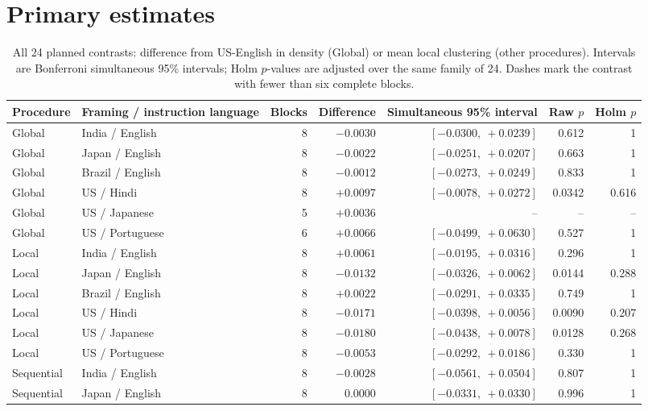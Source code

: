 \documentclass{article}
\begin{document}



\clearpage\onecolumn\appendix
\section{Primary estimates}
\begin{table}[ht]\centering
\caption{All 24 planned contrasts: difference from US-English in density (Global) or mean local clustering (other procedures). Intervals are Bonferroni simultaneous 95\% intervals; Holm $p$-values are adjusted over the same family of 24. Dashes mark the contrast with fewer than six complete blocks.}\label{contrasts}
\small\begin{tabular}{llrrrrr}\toprule Procedure & Framing / instruction language & Blocks & Difference & Simultaneous 95\% interval & Raw $p$ & Holm $p$\\\midrule
Global & India / English & 8 & $-0.0030$ & $[-0.0300,\ +0.0239]$ & 0.612 & 1 \\
Global & Japan / English & 8 & $-0.0022$ & $[-0.0251,\ +0.0207]$ & 0.663 & 1 \\
Global & Brazil / English & 8 & $-0.0012$ & $[-0.0273,\ +0.0249]$ & 0.833 & 1 \\
Global & US / Hindi & 8 & $+0.0097$ & $[-0.0078,\ +0.0272]$ & 0.0342 & 0.616 \\
Global & US / Japanese & 5 & $+0.0036$ & -- & -- & -- \\
Global & US / Portuguese & 6 & $+0.0066$ & $[-0.0499,\ +0.0630]$ & 0.527 & 1 \\
\addlinespace
Local & India / English & 8 & $+0.0061$ & $[-0.0195,\ +0.0316]$ & 0.296 & 1 \\
Local & Japan / English & 8 & $-0.0132$ & $[-0.0326,\ +0.0062]$ & 0.0144 & 0.288 \\
Local & Brazil / English & 8 & $+0.0022$ & $[-0.0291,\ +0.0335]$ & 0.749 & 1 \\
Local & US / Hindi & 8 & $-0.0171$ & $[-0.0398,\ +0.0056]$ & 0.0090 & 0.207 \\
Local & US / Japanese & 8 & $-0.0180$ & $[-0.0438,\ +0.0078]$ & 0.0128 & 0.268 \\
Local & US / Portuguese & 8 & $-0.0053$ & $[-0.0292,\ +0.0186]$ & 0.330 & 1 \\
\addlinespace
Sequential & India / English & 8 & $-0.0028$ & $[-0.0561,\ +0.0504]$ & 0.807 & 1 \\
Sequential & Japan / English & 8 & $0.0000$ & $[-0.0331,\ +0.0330]$ & 0.996 & 1 \\

\end{tabular}
\end{table}
\end{document}
